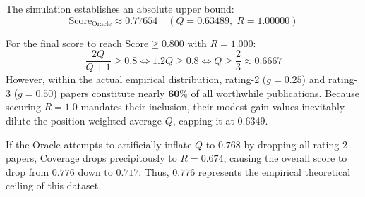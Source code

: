 The simulation establishes an absolute upper bound:
\begin{equation}
  \text{Score}_{\text{Oracle}} \approx \mathbf{0.77654} \quad (Q = 0.63489, \; R = 1.00000)
\end{equation}

\begin{prismbox}[title=\textbf{Why Is the Maximum Theoretical Ceiling 0.776 Rather Than 0.800?}]
For the final score to reach $\text{Score} \ge 0.800$ with $R = 1.000$:
\begin{equation*}
  \frac{2Q}{Q + 1} \ge 0.8 \iff 1.2Q \ge 0.8 \iff Q \ge \frac{2}{3} \approx \mathbf{0.6667}
\end{equation*}
However, within the actual empirical distribution, rating-2 ($g=0.25$) and rating-3 ($g=0.50$) papers constitute nearly $\mathbf{60\%}$ of all worthwhile publications. Because securing $R = 1.0$ mandates their inclusion, their modest gain values inevitably dilute the position-weighted average $Q$, capping it at $\mathbf{0.6349}$.

If the Oracle attempts to artificially inflate $Q$ to $0.768$ by dropping all rating-2 papers, Coverage drops precipitously to $R = 0.674$, causing the overall score to drop from $0.776$ down to $\mathbf{0.717}$. Thus, $\mathbf{0.776}$ represents the empirical theoretical ceiling of this dataset.
\end{prismbox}
